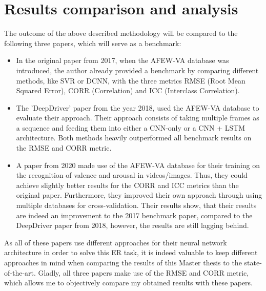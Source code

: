 \documentclass[11pt,a4paper]{scrbook}
\begin{document}

\chapter{Results comparison and analysis}
The outcome of the above described methodology will be compared to the following three papers, which will serve as a benchmark:
\begin{itemize}
    \item In the original paper from 2017, when the AFEW-VA database \cite{Kossaifi:2017:AFEW-VADatabase} was introduced, the author already provided a benchmark by comparing different methods, like SVR or DCNN, with the three metrics RMSE (Root Mean Squared Error), CORR (Correlation) and ICC (Interclass Correlation). 
    \item The 'DeepDriver' paper \cite{Theagarajan:2018:DeepDriver} from the year 2018, used the AFEW-VA database to evaluate their approach. Their approach consists of taking multiple frames as a sequence and feeding them into either a CNN-only or a CNN + LSTM architecture. Both methods heavily outperformed all benchmark results on the RMSE and CORR metric.
    \item A paper from 2020 \cite{Handrich:2020:SimultaneousPredVA} made use of the AFEW-VA database\cite{Kossaifi:2017:AFEW-VADatabase} for their training on the recognition of valence and arousal in videos/images. Thus, they could achieve slightly better results for the CORR and ICC metrics than the original paper. Furthermore, they improved their own approach through using multiple databases for cross-validation. Their results show, that their results are indeed an improvement to the 2017 benchmark paper, compared to the DeepDriver paper from 2018, however, the results are still lagging behind.
\end{itemize}

As all of these papers use different approaches for their neural network architecture in order to solve this \gls{ER} task, it is indeed valuable to keep different approaches in mind when comparing the results of this Master thesis to the state-of-the-art. Gladly, all three papers make use of the RMSE and CORR metric, which allows me to objectively compare my obtained results with these papers.


\end{document}
